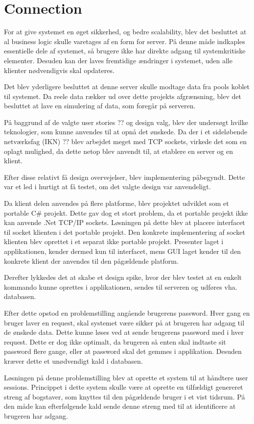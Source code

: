 \section{Connection}\label{sec:designconnection}

For at give systemet en øget sikkerhed, og bedre scalability, blev det besluttet at al business logic skulle varetages af en form for server. På denne måde indkaples essentielle dele af systemet, så brugere ikke har direkte adgang til systemkritiske elementer. Desuden kan der laves fremtidige ændringer i systemet, uden alle klienter nødvendigvis skal opdateres.

Det blev yderligere besluttet at denne server skulle modtage data fra pools koblet til systemet. Da reele data rækker ud over dette projekts afgrænsning, blev det besluttet at lave en simulering af data, som foregår på serveren.

På baggrund af de valgte user stories ?? og design valg, blev der undersøgt hvilke teknologier, som kunne anvendes til at opnå det ønskede. Da der i et sideløbende netværksfag (IKN) ?? blev arbejdet meget med TCP sockets, virkede det som en oplagt mulighed, da dette netop blev anvendt til, at etablere en server og en klient.

Efter disse relativt få design overvejelser, blev implementering påbegyndt. Dette var et led i hurtigt at få testet, om det valgte design var anvendeligt. 

Da klient delen anvendes på flere platforme, blev projektet udviklet som et portable C# projekt. Dette gav dog et stort problem, da et portable projekt ikke kan anvende .Net TCP/IP sockets. Løsningen på dette blev at placere interfacet til socket klienten i det portable projekt. Den konkrete implementering af socket klienten blev oprettet i et separat ikke portable projekt. Presenter laget i applikationen, kender dermed kun til interfacet, mens GUI laget kender til den konkrete klient der anvendes til den pågældende platform.

Derefter lykkedes det at skabe et design spike, hvor der blev testet at en enkelt kommando kunne oprettes i applikationen, sendes til serveren og udføres vha. databasen. 

Efter dette opstod en problemstilling angående brugerens password. Hver gang en bruger laver en request, skal systemet være sikker på at brugeren har adgang til de ønskede data. Dette kunne løses ved at sende brugerens password med i hver request. Dette er dog ikke optimalt, da brugeren så enten skal indtaste sit password flere gange, eller at password skal det gemmes i applikation. Desuden kræver dette et unødvendigt kald i databasen. 

Løsningen på denne problemstilling blev at oprette et system til at håndtere user sessions. Princippet i dette system skulle være at oprette en tilfældigt genereret streng af bogstaver, som knyttes til den pågældende bruger i et vist tidsrum. På den måde kan efterfølgende kald sende denne streng med til at identificere at brugeren har adgang. 

